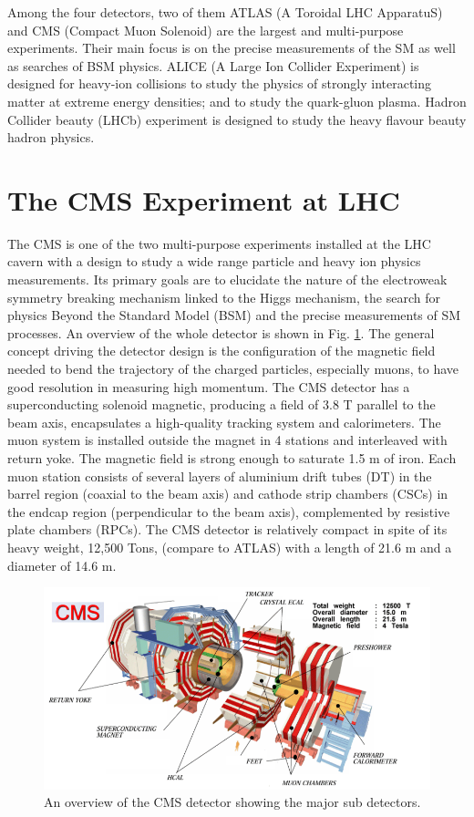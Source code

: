 Among the four detectors, two of them ATLAS (A Toroidal LHC ApparatuS) and CMS (Compact Muon Solenoid) are the largest and multi-purpose experiments. Their main focus is on the precise measurements of the SM as well as searches of BSM physics. ALICE (A Large Ion Collider
Experiment) is designed for heavy-ion collisions to study the physics of strongly interacting matter at extreme energy densities; and to study the quark-gluon plasma. Hadron Collider beauty (LHCb) experiment is designed to study the heavy flavour beauty hadron physics.

\section{The CMS Experiment at LHC}\label{sec:cms}
The CMS \cite{cms_exp} is one of the two multi-purpose experiments installed at the LHC cavern with a design to study a wide range particle and heavy ion physics measurements. Its primary goals are to elucidate the nature of the electroweak symmetry breaking mechanism linked to the Higgs mechanism, the search for physics Beyond the Standard Model (BSM) and the precise measurements of SM processes. An overview of the whole detector is shown in Fig. \ref{fig:CMS_exper}. The general concept driving the detector design is the configuration of the magnetic field needed to bend the trajectory of the charged particles, especially muons, to have good resolution in measuring high momentum. The CMS detector has a superconducting solenoid magnetic, producing a field of 3.8 T parallel to the beam axis, encapsulates a high-quality tracking system and calorimeters. The muon system is installed outside the magnet in 4 stations and interleaved with return yoke. The magnetic field is strong enough to saturate 1.5 m of iron. Each muon station consists of several layers of aluminium drift tubes (DT) in the barrel region (coaxial to the beam axis) and cathode strip chambers (CSCs) in the endcap region (perpendicular to the beam axis), complemented by resistive plate chambers (RPCs). The CMS detector is relatively compact in spite of its heavy weight, 12,500 Tons, (compare to ATLAS) with a length of 21.6 m and a diameter of 14.6 m. \\
\begin{figure}[h!]
\includegraphics[width=1.05\textwidth]{fig/chapt3/CMS_exper.png}
\caption{\label{fig:CMS_exper} An overview of the CMS detector showing the major sub detectors.}
\end{figure}
